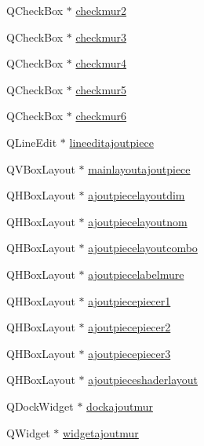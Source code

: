 \begin{DoxyCompactItemize}
\item 
Q\+Check\+Box $\ast$ \hyperlink{class_main_window_a9311b2ff986d09836c8e385348acd571}{checkmur2}
\item 
Q\+Check\+Box $\ast$ \hyperlink{class_main_window_a71169e71f8f50fc126c8cdaad981cad7}{checkmur3}
\item 
Q\+Check\+Box $\ast$ \hyperlink{class_main_window_a2e8fae74cfc9045da4dfcba506aacca4}{checkmur4}
\item 
Q\+Check\+Box $\ast$ \hyperlink{class_main_window_a13b9eb7874b1b8363eb8ee0399e0a6db}{checkmur5}
\item 
Q\+Check\+Box $\ast$ \hyperlink{class_main_window_a0e9dad3f68b376acacd166f6a58ea4dd}{checkmur6}
\item 
Q\+Line\+Edit $\ast$ \hyperlink{class_main_window_ac6b2333b54d4551f41d0941c7f171097}{lineeditajoutpiece}
\item 
Q\+V\+Box\+Layout $\ast$ \hyperlink{class_main_window_a9c7efc08e16b1648f53664b98dc99c00}{mainlayoutajoutpiece}
\item 
Q\+H\+Box\+Layout $\ast$ \hyperlink{class_main_window_ae06a728d54678994456d0585d265baf0}{ajoutpiecelayoutdim}
\item 
Q\+H\+Box\+Layout $\ast$ \hyperlink{class_main_window_a48cf0bbc5e90a751711519a7c7c2af7b}{ajoutpiecelayoutnom}
\item 
Q\+H\+Box\+Layout $\ast$ \hyperlink{class_main_window_a195ed8cd075a1153faa7926f38b08609}{ajoutpiecelayoutcombo}
\item 
Q\+H\+Box\+Layout $\ast$ \hyperlink{class_main_window_a7fc456fae07aba46102c8670721688e6}{ajoutpiecelabelmure}
\item 
Q\+H\+Box\+Layout $\ast$ \hyperlink{class_main_window_a49e6b8184f85caeec9b9936999387e8f}{ajoutpiecepiecer1}
\item 
Q\+H\+Box\+Layout $\ast$ \hyperlink{class_main_window_a01a7211a86eb47e523b13d18beedd7c5}{ajoutpiecepiecer2}
\item 
Q\+H\+Box\+Layout $\ast$ \hyperlink{class_main_window_ac059f285df8d02b2deaf915f82c4c247}{ajoutpiecepiecer3}
\item 
Q\+H\+Box\+Layout $\ast$ \hyperlink{class_main_window_aace055ea8d65d6138d60d7a40da1c707}{ajoutpieceshaderlayout}
\item 
Q\+Dock\+Widget $\ast$ \hyperlink{class_main_window_a0eb8a5430ee63be81d1c931749ccb5f0}{dockajoutmur}
\item 
Q\+Widget $\ast$ \hyperlink{class_main_window_a0513cad983e4a377963a107bb75eea00}{widgetajoutmur}
\item 

\end{DoxyCompactItemize}
